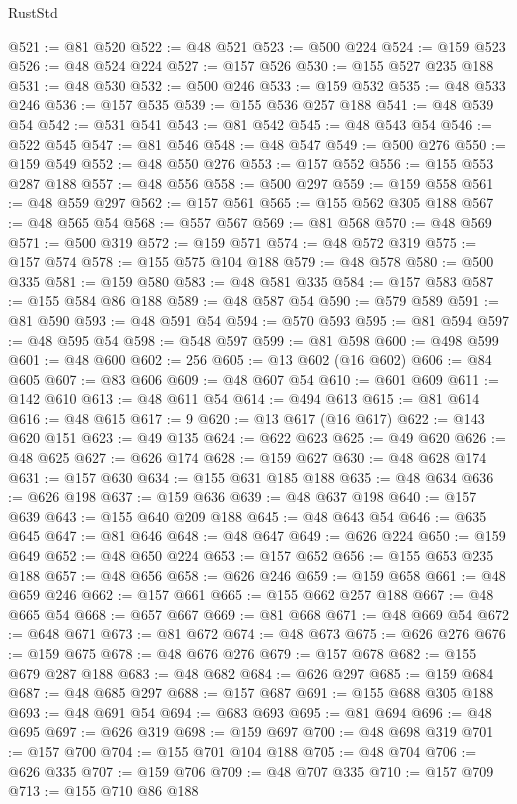 \begin{lexlean}{RustStd}
\begin{coremodule}
{\begin{coremodule}
{{{{{@521 := @81 @520
@522 := @48 @521
@523 := @500 @224
@524 := @159 @523
@526 := @48 @524 @224
@527 := @157 @526
@530 := @155 @527 @235 @188
@531 := @48 @530
@532 := @500 @246
@533 := @159 @532
@535 := @48 @533 @246
@536 := @157 @535
@539 := @155 @536 @257 @188
@541 := @48 @539 @54
@542 := @531 @541
@543 := @81 @542
@545 := @48 @543 @54
@546 := @522 @545
@547 := @81 @546
@548 := @48 @547
@549 := @500 @276
@550 := @159 @549
@552 := @48 @550 @276
@553 := @157 @552
@556 := @155 @553 @287 @188
@557 := @48 @556
@558 := @500 @297
@559 := @159 @558
@561 := @48 @559 @297
@562 := @157 @561
@565 := @155 @562 @305 @188
@567 := @48 @565 @54
@568 := @557 @567
@569 := @81 @568
@570 := @48 @569
@571 := @500 @319
@572 := @159 @571
@574 := @48 @572 @319
@575 := @157 @574
@578 := @155 @575 @104 @188
@579 := @48 @578
@580 := @500 @335
@581 := @159 @580
@583 := @48 @581 @335
@584 := @157 @583
@587 := @155 @584 @86 @188
@589 := @48 @587 @54
@590 := @579 @589
@591 := @81 @590
@593 := @48 @591 @54
@594 := @570 @593
@595 := @81 @594
@597 := @48 @595 @54
@598 := @548 @597
@599 := @81 @598
@600 := @498 @599
@601 := @48 @600
@602 := 256
@605 := @13 @602 (@16 @602)
@606 := @84 @605
@607 := @83 @606
@609 := @48 @607 @54
@610 := @601 @609
@611 := @142 @610
@613 := @48 @611 @54
@614 := @494 @613
@615 := @81 @614
@616 := @48 @615
@617 := 9
@620 := @13 @617 (@16 @617)
@622 := @143 @620 @151
@623 := @49 @135
@624 := @622 @623
@625 := @49 @620
@626 := @48 @625
@627 := @626 @174
@628 := @159 @627
@630 := @48 @628 @174
@631 := @157 @630
@634 := @155 @631 @185 @188
@635 := @48 @634
@636 := @626 @198
@637 := @159 @636
@639 := @48 @637 @198
@640 := @157 @639
@643 := @155 @640 @209 @188
@645 := @48 @643 @54
@646 := @635 @645
@647 := @81 @646
@648 := @48 @647
@649 := @626 @224
@650 := @159 @649
@652 := @48 @650 @224
@653 := @157 @652
@656 := @155 @653 @235 @188
@657 := @48 @656
@658 := @626 @246
@659 := @159 @658
@661 := @48 @659 @246
@662 := @157 @661
@665 := @155 @662 @257 @188
@667 := @48 @665 @54
@668 := @657 @667
@669 := @81 @668
@671 := @48 @669 @54
@672 := @648 @671
@673 := @81 @672
@674 := @48 @673
@675 := @626 @276
@676 := @159 @675
@678 := @48 @676 @276
@679 := @157 @678
@682 := @155 @679 @287 @188
@683 := @48 @682
@684 := @626 @297
@685 := @159 @684
@687 := @48 @685 @297
@688 := @157 @687
@691 := @155 @688 @305 @188
@693 := @48 @691 @54
@694 := @683 @693
@695 := @81 @694
@696 := @48 @695
@697 := @626 @319
@698 := @159 @697
@700 := @48 @698 @319
@701 := @157 @700
@704 := @155 @701 @104 @188
@705 := @48 @704
@706 := @626 @335
@707 := @159 @706
@709 := @48 @707 @335
@710 := @157 @709
@713 := @155 @710 @86 @188
}}}}}
\end{coremodule}}
\end{coremodule}
\end{lexlean}
